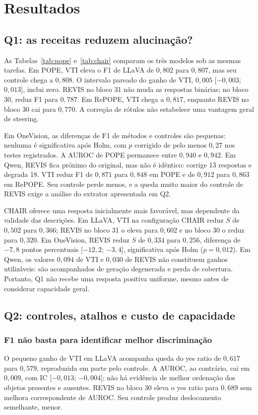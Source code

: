 \section{Resultados}
\subsection{Q1: as receitas reduzem alucinação?}


As Tabelas~\ref{tab:pope} e~\ref{tab:chair} comparam os três modelos sob as mesmas tarefas. Em POPE, VTI eleva o F1 de LLaVA de $0{,}802$ para $0{,}807$, mas seu controle chega a $0{,}808$. O intervalo pareado do ganho de VTI, $0{,}005$ [$-0{,}003$; $0{,}013$], inclui zero. REVIS no bloco 31 não muda as respostas binárias; no bloco 30, reduz F1 para $0{,}787$. Em RePOPE, VTI chega a $0{,}817$, enquanto REVIS no bloco 30 cai para $0{,}770$. A correção de rótulos não estabelece uma vantagem geral de steering.

Em OneVision, as diferenças de F1 de métodos e controles são pequenas: nenhuma é significativa após Holm, com $p$ corrigido de pelo menos $0{,}27$ nos testes registrados. A AUROC de POPE permanece entre $0{,}940$ e $0{,}942$. Em Qwen, REVIS fica próximo do original, mas não é idêntico: corrige 13 respostas e degrada 18. VTI reduz F1 de $0{,}871$ para $0{,}848$ em POPE e de $0{,}912$ para $0{,}863$ em RePOPE. Seu controle perde menos, e a queda muito maior do controle de REVIS exige a análise do extrator apresentada em Q2.

CHAIR oferece uma resposta inicialmente mais favorável, mas dependente da validade das descrições. Em LLaVA, VTI na configuração CHAIR reduz $S$ de $0{,}502$ para $0{,}366$; REVIS no bloco 31 o eleva para $0{,}602$ e no bloco 30 o reduz para $0{,}320$. Em OneVision, REVIS reduz $S$ de $0{,}334$ para $0{,}256$, diferença de $-7{,}8$ pontos percentuais [$-12{,}2$; $-3{,}4$], significativa após Holm ($p=0{,}012$). Em Qwen, os valores $0{,}094$ de VTI e $0{,}030$ de REVIS não constituem ganhos utilizáveis: são acompanhados de geração degenerada e perda de cobertura. Portanto, Q1 não recebe uma resposta positiva uniforme, mesmo antes de considerar capacidade geral.

\subsection{Q2: controles, atalhos e custo de capacidade}
\subsubsection{F1 não basta para identificar melhor discriminação}
O pequeno ganho de VTI em LLaVA acompanha queda do yes ratio de $0{,}617$ para $0{,}579$, reproduzida em parte pelo controle. A AUROC, ao contrário, cai em $0{,}009$, com IC [$-0{,}013$; $-0{,}004$]; não há evidência de melhor ordenação dos objetos presentes e ausentes. REVIS no bloco 30 eleva o yes ratio para $0{,}689$ sem melhora correspondente de AUROC. Seu controle produz deslocamento semelhante, menor.

